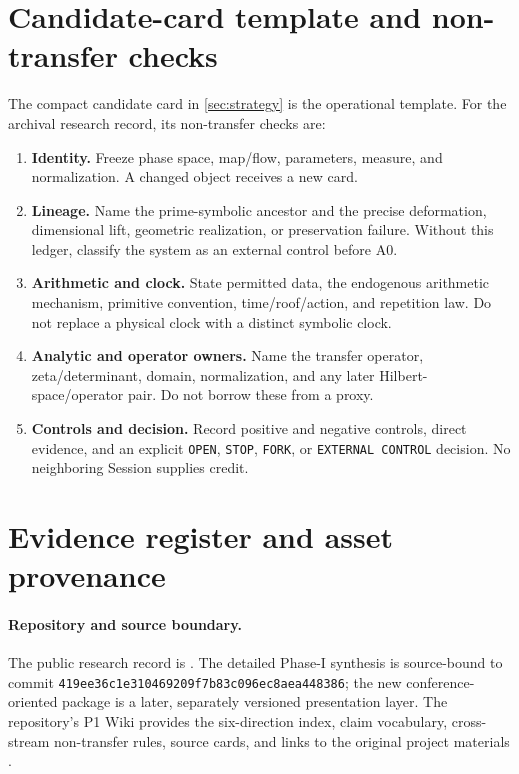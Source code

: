 \section{Candidate-card template and non-transfer checks}
\label{app:card}

The compact candidate card in \cref{sec:strategy} is the operational
template. For the archival research record, its non-transfer checks are:

\begin{enumerate}[label=\textbf{C\arabic*.},leftmargin=1.45em]
\item \textbf{Identity.} Freeze phase space, map/flow, parameters, measure,
and normalization. A changed object receives a new card.
\item \textbf{Lineage.} Name the prime-symbolic ancestor and the precise
deformation, dimensional lift, geometric realization, or preservation failure.
Without this ledger, classify the system as an external control before A0.
\item \textbf{Arithmetic and clock.} State permitted data, the endogenous
arithmetic mechanism, primitive convention, time/roof/action, and repetition
law. Do not replace a physical clock with a distinct symbolic clock.
\item \textbf{Analytic and operator owners.} Name the transfer operator,
zeta/determinant, domain, normalization, and any later Hilbert-space/operator
pair. Do not borrow these from a proxy.
\item \textbf{Controls and decision.} Record positive and negative controls,
direct evidence, and an explicit \texttt{OPEN}, \texttt{STOP}, \texttt{FORK},
or \texttt{EXTERNAL CONTROL} decision. No neighboring Session supplies credit.
\end{enumerate}
\section{Evidence register and asset provenance}
\label{app:provenance}

\paragraph{Repository and source boundary.}
The public research record is \repo. The detailed Phase-I synthesis is
source-bound to commit \texttt{419ee36c1e310469209f7b83c096ec8aea448386}; the
new conference-oriented package is a later, separately versioned presentation
layer. The repository's P1 Wiki provides the six-direction index, claim
vocabulary, cross-stream non-transfer rules, source cards, and links to the
original project materials \citep{PhaseIRepository}.

